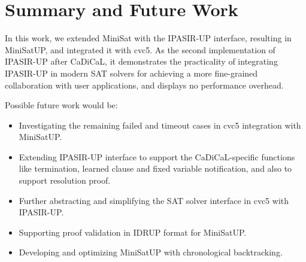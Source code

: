 \chapter{Summary and Future Work}

In this work, we extended MiniSat with the IPASIR-UP interface, resulting in MiniSatUP, and integrated it with cvc5. As the second implementation of IPASIR-UP after CaDiCaL, it demonstrates the practicality of integrating IPASIR-UP in modern SAT solvers for achieving a more fine-grained collaboration with user applications, and displays no performance overhead.

Possible future work would be:

\begin{itemize}
  \item Investigating the remaining failed and timeout cases in cvc5 integration with MiniSatUP.
  \item Extending IPASIR-UP interface to support the CaDiCaL-specific functions like termination, learned clause and fixed variable notification, and also to support resolution proof.
  \item Further abstracting and simplifying the SAT solver interface in cvc5 with IPASIR-UP.
  \item Supporting proof validation in IDRUP format for MiniSatUP.
  \item Developing and optimizing MiniSatUP with chronological backtracking.
\end{itemize}

